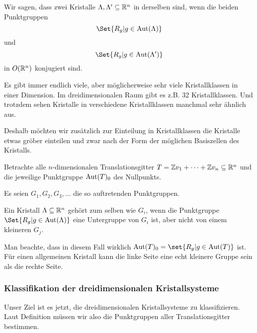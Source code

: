 \begin{definition}[Kristallklassen]
Wir sagen, dass zwei Kristalle $\Lambda,\Lambda'\subseteq\mathbb{R}^n$ in derselben  sind, wenn die beiden Punktgruppen
\[\Set{R_g | g\in\Aut(\Lambda)}\]
und
\[\Set{R_g | g\in\Aut(\Lambda')}\]
in $O(\mathbb{R}^n)$ konjugiert sind.
\end{definition}

\begin{remark}
Es gibt immer endlich viele, aber möglicherweise sehr viele Kristallklassen in einer Dimension. Im dreidimensionalen Raum gibt es z.B. 32 Kristallklassen. Und trotzdem sehen Kristalle in verschiedene Kristallklassen manchmal sehr ähnlich aus.

Deshalb möchten wir zusätzlich zur Einteilung in Kristallklassen die Kristalle etwas gröber einteilen und zwar nach der Form der möglichen Basiszellen des Kristalls.
\end{remark}

\begin{definition}[Kristallsysteme]
Betrachte alle $n$-dimensionalen Translationsgitter $T=\mathbb{Z} v_1+\cdots+\mathbb{Z} v_n\subseteq\mathbb{R}^n$ und die jeweilige Punktgruppe $\operatorname{Aut}(T)_0$ des Nullpunkts.

Es seien $G_1, G_2, G_3, \ldots$ die so auftretenden Punktgruppen.

Ein Kristall $\Lambda\subseteq\mathbb{R}^n$ gehört zum selben  wie $G_i$, wenn die Punktgruppe $\Set{R_g | g\in\Aut(\Lambda)}$ eine Untergruppe von $G_i$ ist, aber nicht von einem kleineren $G_j$.
\end{definition}

\begin{remark}
Man beachte, dass in diesem Fall wirklich $\Aut(T)_0 = \set{R_g | g\in \Aut(T)}$ ist. Für einen allgemeinen Kristall kann die linke Seite eine echt kleinere Gruppe sein als die rechte Seite.
\end{remark}

\subsubsection{Klassifikation der dreidimensionalen Kristallsysteme}

\begin{remark}
Unser Ziel ist es jetzt, die dreidimensionalen Kristallsysteme zu klassifizieren. Laut Definition müssen wir also die Punktgruppen aller Translationsgitter bestimmen.
\end{remark}

